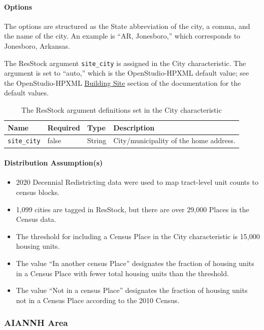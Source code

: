\paragraph{Options}
The options are structured as the State abbreviation of the city, a comma, and the name of the city. An example is ``AR, Jonesboro,'' which corresponds to Jonesboro, Arkansas.

The ResStock argument \texttt{site\_city} is assigned in the City characteristic. The argument is set to ``auto,'' which is the OpenStudio-HPXML default value; see the OpenStudio-HPXML \href{https://openstudio-hpxml.readthedocs.io/en/v1.8.1/workflow_inputs.html#hpxml-building-site}{Building Site} section of the documentation for the default values.

\begin{longtable}[]{ |p{}|p{1.5cm}|p{1.1cm}|p{6cm}| }
\caption{The ResStock argument definitions set in the City characteristic} \label{table:hc_arg_def_city}  \\
\toprule\noalign{}
Name & Required & Type  & Description \\
\midrule\noalign{}
\endhead
\bottomrule\noalign{}
\endlastfoot
\texttt{site\_city} & false & String & City/municipality of the home
address. \\
\end{longtable}

\paragraph{Distribution Assumption(s)}
\begin{itemize}
\item
  2020 Decennial Redistricting data were used to map tract-level unit
  counts to census blocks.
\item
  1,099 cities are tagged in ResStock, but there are over 29,000 Places
  in the Census data.
\item
  The threshold for including a Census Place in the City characteristic is 15,000 housing units.
\item
  The value ``In another census Place'' designates the fraction of housing units in a Census Place with fewer total housing units than the threshold.
\item
  The value ``Not in a census Place''
  designates the fraction of housing units not in a Census Place
  according to the 2010 Census.
\end{itemize}


\subsubsection{AIANNH Area}
